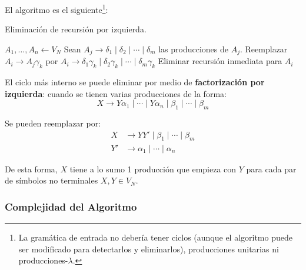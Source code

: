 El algoritmo es el siguiente\footnote{La gramática de entrada no debería tener ciclos (aunque el algoritmo puede ser modificado para detectarlos y eliminarlos), producciones unitarias ni producciones-$\lambda$.}:

\begin{algorithm}[H]
    \caption{Eliminación de recursión por izquierda.}
    \label{eliminacion-recursion-izquierda}
    \begin{algorithmic}[1]
        \State $A_1, \dots, A_n \gets V_N$
                \State Sean $A_j \to \delta_1 \mid \delta_2 \mid \cdots \mid \delta_m$ las producciones de $A_j$.
                    \State Reemplazar $A_i \to A_j \gamma_k$ por $A_i \to \delta_1 \gamma_k \mid \delta_2 \gamma_k \mid \cdots \mid \delta_m \gamma_k$
                \EndFor
            \EndFor
        \State Eliminar recursión inmediata para $A_i$
        \EndFor
        \EndProcedure
    \end{algorithmic}
\end{algorithm}

El ciclo más interno se puede eliminar por medio de \textbf{factorización por izquierda}: cuando se tienen varias producciones de la forma:
$$
    X \to Y \alpha_1 \mid \cdots \mid Y \alpha_n \mid \beta_1 \mid \cdots \mid \beta_m
$$

Se pueden reemplazar por:
$$
\begin{aligned}
    X & \to Y Y' \mid \beta_1 \mid \cdots \mid \beta_m \\
    Y' & \to \alpha_1 \mid \cdots \mid \alpha_n
\end{aligned}
$$

De esta forma, $X$ tiene a lo sumo 1 producción que empieza con $Y$ para cada par de símbolos no terminales $X, Y \in V_N$.

\subsubsection{Complejidad del Algoritmo}

